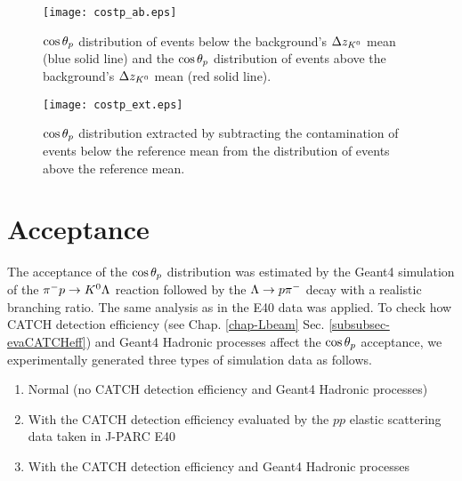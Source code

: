 \begin{figure}[h]
  \centering
  \texttt{[image: costp\_ab.eps]}
  \caption{$\cos{\theta_p}$ distribution of events below the background's $\Delta z_{K^{0}}$ mean (blue solid line) and the $\cos{\theta_p}$ distribution of events above the background's $\Delta z_{K^{0}}$ mean (red solid line).}
  \label{fig-costp_ab}
\end{figure}

\begin{figure}[h]
  \centering
  \texttt{[image: costp\_ext.eps]}
  \caption{$\cos{\theta_p}$ distribution extracted by subtracting the contamination of events below the reference mean from the distribution of events above the reference mean.}
  \label{fig-costp_ext}
\end{figure}


\clearpage
\section{Acceptance}
\label{sec-accPl}

The acceptance of the $\cos{\theta_p}$ distribution was estimated by the Geant4 simulation of the $\pi^- p \to K^0 \Lambda$ reaction followed by the $\Lambda\to p\pi^{-}$ decay with a realistic branching ratio. The same analysis as in the E40 data was applied. To check how CATCH detection efficiency (see Chap. \ref{chap-Lbeam} Sec. \ref{subsubsec-evaCATCHeff}) and Geant4 Hadronic processes affect the $\cos{\theta_p}$ acceptance, we experimentally generated three types of simulation data as follows.
\begin{enumerate}
  \item Normal (no CATCH detection efficiency and Geant4 Hadronic processes)
  \item With the CATCH detection efficiency evaluated by the $pp$ elastic scattering data taken in J-PARC E40
  \item With the CATCH detection efficiency and Geant4 Hadronic processes
  \label{list-threetypes}
\end{enumerate}



